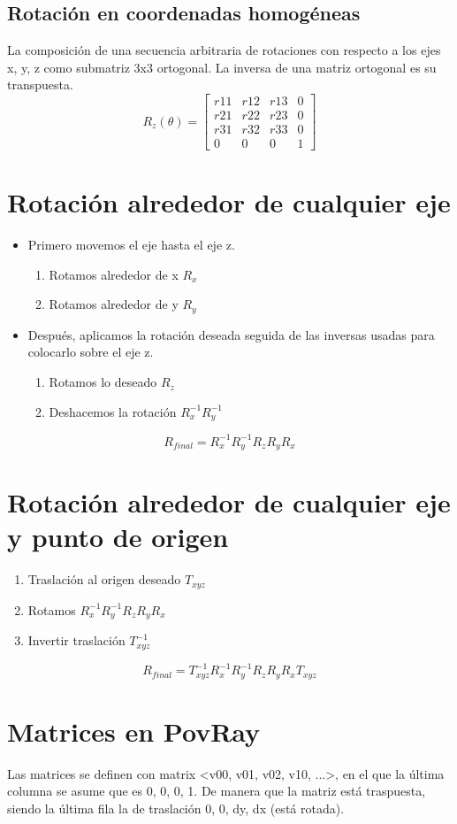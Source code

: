 \subsection{Rotación en coordenadas homogéneas}
La composición de una secuencia arbitraria de rotaciones con respecto a los ejes x, y, z como submatriz 3x3 ortogonal. La inversa de una matriz ortogonal es su transpuesta.
$$R_z(\theta)=\left[\begin{matrix}
r11 & r12 & r13 & 0 \\ 
r21 & r22 & r23 & 0 \\ 
r31 & r32 & r33 & 0 \\
0 & 0 & 0 & 1
\end{matrix}\right]$$

\section{Rotación alrededor de cualquier eje}
\begin{itemize}
    \item Primero movemos el eje hasta el eje z.
    \begin{enumerate}
        \item Rotamos alrededor de x $R_x$
        \item Rotamos alrededor de y $R_y$
    \end{enumerate}
    \item Después, aplicamos la rotación deseada seguida de las inversas usadas para colocarlo sobre el eje z.
    \begin{enumerate}
        \item Rotamos lo deseado $R_z$
        \item Deshacemos la rotación $R_x^{-1}R_y^{-1}$
    \end{enumerate}
\end{itemize}
$$R_{final}=R_x^{-1}R_y^{-1}R_zR_yR_x$$

\section{Rotación alrededor de cualquier eje y punto de origen}
\begin{enumerate}
    \item Traslación al origen deseado $T_{xyz}$
    \item Rotamos $R_x^{-1}R_y^{-1}R_zR_yR_x$
    \item Invertir traslación $T_{xyz}^{-1}$
\end{enumerate}
$$R_{final}=T_{xyz}^{-1}R_x^{-1}R_y^{-1}R_zR_yR_xT_{xyz}$$

\section{Matrices en PovRay}
Las matrices se definen con matrix <v00, v01, v02, v10, ...>, en el que la última columna se asume que es 0, 0, 0, 1. De manera que la matriz está traspuesta, siendo la última fila la de traslación 0, 0, dy, dx (está rotada).